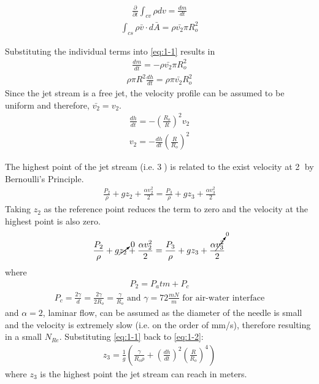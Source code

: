 \documentclass{article}
\begin{document}
\begin{align*}
\frac{\partial}{\partial{t}} \int_{cv} \rho dv = \frac{dm}{dt}
\end{align*}
\begin{align*}
\int_{cs} \rho \bar{v} \cdot d\bar{A} = \rho \bar{v_2} \pi R_o^2
\end{align*}

Substituting the individual terms into \eqref{eq:1-1} results in
\begin{align*}
\frac{dm}{dt} = - \rho \bar{v_2} \pi R_o^2
\end{align*}
\begin{align*}
\rho \pi R^2 \frac{dh}{dt} = \rho \pi \bar{v_2} R_o^2
\end{align*}
Since the jet stream is a free jet, the velocity profile can be assumed to be uniform and therefore, $\bar{v_2} = v_2$.
\begin{align*}
\frac{dh}{dt} = -(\frac{R_o}{R})^2 v_2
\end{align*}
\begin{align}
v_2 = -\frac{dh}{dt} (\frac{R}{R_o})^2
\end{align}

The highest point of the jet stream (i.e. \textcircled{3}) is related to the exist velocity at \textcircled{2} by Bernoulli's Principle.
\begin{align*}
\frac{P_2}{\rho} + g z_2 + \frac{\alpha v_2^2}{2} = \frac{P_3}{\rho} + g z_3 + \frac{\alpha v_3^2}{2} 
\end{align*}
Taking $z_2$ as the reference point reduces the term to zero and the velocity at the highest point is also zero.
\begin{align}
\frac{P_2}{\rho} + g \cancelto{0}{z_2} + \frac{\alpha v_2^2}{2} = \frac{P_3}{\rho} + g z_3 + \frac{\alpha \cancelto{0}{v_3^2}}{2} \label{eq:1-2}  
\end{align}
where
\begin{align*}
P_2 = P_atm + P_c
\end{align*}
\begin{align*}
P_c = \frac{2\gamma}{d} = \frac{2\gamma}{2 R_o} = \frac{\gamma}{R_o}  \textrm{ and } \gamma = 72 \frac{mN}{m}  \textrm{ for air-water interface}
\end{align*}
and $\alpha = 2$, laminar flow, can be assumed as the diameter of the needle is small and the velocity is extremely slow (i.e. on the order of mm/s), therefore resulting in a small $N_{Re}$. Substituting \eqref{eq:1-1} back to \eqref{eq:1-2}:
\begin{align}
z_3 = \frac{1}{g} (\frac{\gamma}{R_o \rho} + (\frac{dh}{dt})^2(\frac{R}{R_o})^4)  \label{eq:1-3}  
\end{align}
where $z_3$ is the highest point the jet stream can reach in meters.
\end{document}
